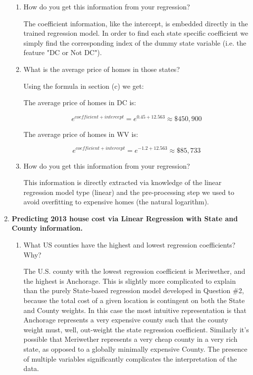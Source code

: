 \documentclass[12pt]{article}
\begin{document}
\begin{enumerate}[leftmargin=\labelsep]
\begin{enumerate}[label=(\alph*)]
  \item How do you get this information from your regression?

    The coefficient information, like the intercept, is embedded directly in the trained regression model. In order to find each state specific coefficient we simply find the corresponding index of the dummy state variable (i.e. the feature "DC or Not DC").

  \item What is the average price of homes in those states?

    Using the formula in section (c) we get:

    The average price of homes in DC is:

      \[ e^{coefficient + intercept} = e^{0.45 + 12.563} \approx \$450,900 \]

    The average price of homes in WV is:

      \[ e^{coefficient + intercept} = e^{-1.2 + 12.563} \approx \$85,733 \]

  \item How do you get this information from your regression?

    This information is directly extracted via knowledge of the linear regression model type (linear) and the pre-processing step we used to avoid overfitting to expensive homes (the natural logarithm).

  \end{enumerate}

\item \textbf{Predicting 2013 house cost via Linear Regression with State and County information.}

  \begin{enumerate}[label=(\alph*)]
  \item What US counties have the highest and lowest regression coefficients? Why?

    The U.S. county with the lowest regression coefficient is Meriwether, and the highest is Anchorage. This is slightly more complicated to explain than the purely State-based regression model developed in Question \#2, because the total cost of a given location is contingent on both the State and County weights. In this case the most intuitive representation is that Anchorage represents a very expensive county such that the county weight must, well, out-weight the state regression coefficient. Similarly it's possible that Meriwether represents a very cheap county in a very rich state, as opposed to a globally minimally expensive County. The presence of multiple variables significantly complicates the interpretation of the data.


\end{enumerate}
\end{enumerate}
\end{document}
